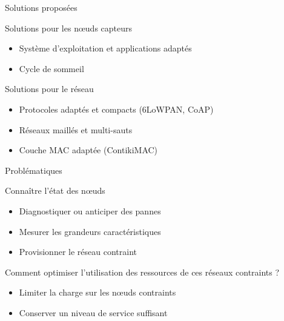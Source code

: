 \begin{frame}{Solutions proposées}

  \begin{block}{Solutions pour les nœuds capteurs}
    \begin{itemize}
      \item Système d'exploitation et applications adaptés
      \item Cycle de sommeil
    \end{itemize}
  \end{block}

  \begin{block}{Solutions pour le réseau}
    \begin{itemize}
      \item Protocoles adaptés et compacts (6LoWPAN, CoAP)
      \item Réseaux maillés et multi-sauts
      \item Couche MAC adaptée (ContikiMAC)
    \end{itemize}
  \end{block}
\end{frame}

\begin{frame}{Problématiques}
  \begin{block}{Connaître l'état des nœuds}
    \begin{itemize}
      \item Diagnostiquer ou anticiper des pannes
      \item Mesurer les grandeurs caractéristiques
      \item Provisionner le réseau contraint
    \end{itemize}
  \end{block}

  \begin{block}{Comment optimiser l'utilisation des ressources de ces réseaux contraints ?}
    \begin{itemize}
      \item Limiter la charge sur les nœuds contraints
      \item Conserver un niveau de service suffisant
    \end{itemize}
  \end{block}

\end{frame}


